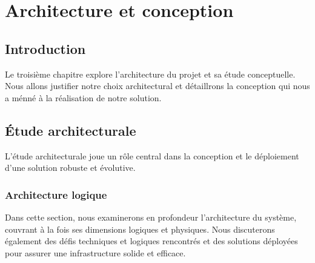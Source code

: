 \chapter{Architecture et conception}

\section*{Introduction}
    \par Le troisième chapitre explore l'architecture du projet et sa étude conceptuelle. 
Nous allons justifier notre choix architectural et détaillrons la conception qui nous a ménné à la réalisation de notre solution.

\section{Étude architecturale}
    \par  L'étude architecturale joue un rôle central dans la conception et le déploiement d'une solution robuste et évolutive.
\subsection{Architecture logique}
\par Dans cette section, nous examinerons en profondeur l'architecture du système, couvrant à la fois ses dimensions logiques et physiques. Nous discuterons également des défis techniques et logiques rencontrés et des solutions déployées pour assurer une infrastructure solide et efficace.

